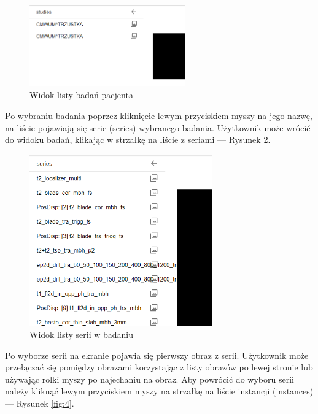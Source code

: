 \documentclass[a4paper,11pt,twoside,openright]{report}
\theoremstyle{definition}
\begin{document}
\begin{enumerate}
\begin{figure}[h!]
	\center
	\includegraphics[width=0.6\textwidth]{2}
	\caption{Widok listy badań pacjenta}
    	\label{fig:2}
\end{figure}

\pagebreak

Po wybraniu badania poprzez kliknięcie lewym przyciskiem myszy na jego nazwę,
na liście pojawiają się serie (series) wybranego badania. Użytkownik może wrócić
do widoku badań, klikając w strzałkę na liście z seriami --- Rysunek \ref{fig:3}.

\begin{figure}[h!]
	\center
	\includegraphics[width=0.7\textwidth]{3}
	\caption{Widok listy serii w badaniu}
    	\label{fig:3}
\end{figure}

Po wyborze serii na ekranie pojawia się pierwszy obraz z serii. Użytkownik
może przełączać się pomiędzy obrazami korzystając z listy obrazów po lewej
stronie lub używając rolki myszy po najechaniu na obraz. Aby powrócić do wyboru
serii należy kliknąć lewym przyciskiem myszy na strzałkę na liście instancji
(instances) --- Rysunek \ref{fig:4}.

\pagebreak


\end{enumerate}
\end{document}
